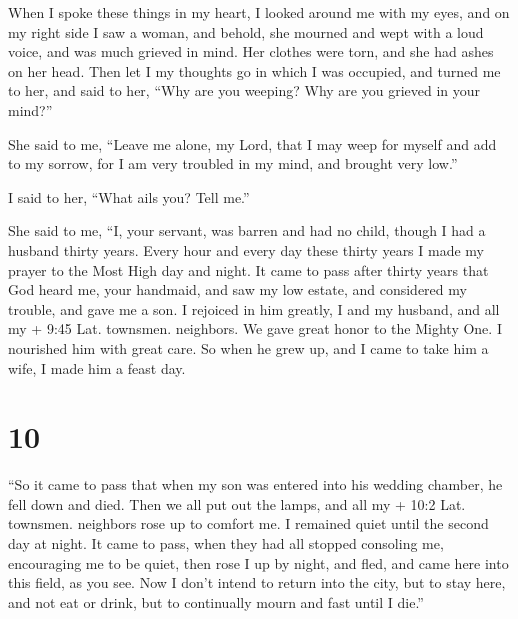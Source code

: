  When I spoke these things in my heart, I looked around me
with my eyes, and on my right side I saw a woman, and behold, she
mourned and wept with a loud voice, and was much grieved in mind. Her
clothes were torn, and she had ashes on her head.  Then let
I my thoughts go in which I was occupied, and turned me to her,
 and said to her, ``Why are you weeping? Why are you
grieved in your mind?''

 She said to me, ``Leave me alone, my Lord, that I may weep
for myself and add to my sorrow, for I am very troubled in my mind, and
brought very low.''

 I said to her, ``What ails you? Tell me.''

 She said to me, ``I, your servant, was barren and had no
child, though I had a husband thirty years.  Every hour and
every day these thirty years I made my prayer to the Most High day and
night.  It came to pass after thirty years that God heard
me, your handmaid, and saw my low estate, and considered my trouble, and
gave me a son. I rejoiced in him greatly, I and my husband, and all my +
9:45 Lat. townsmen. neighbors. We gave great honor to the Mighty One.
 I nourished him with great care.  So when he
grew up, and I came to take him a wife, I made him a feast day.

\hypertarget{section-9}{%
\section{10}\label{section-9}}

 ``So it came to pass that when my son was entered into his
wedding chamber, he fell down and died.  Then we all put out
the lamps, and all my + 10:2 Lat. townsmen. neighbors rose up to comfort
me. I remained quiet until the second day at night.  It came
to pass, when they had all stopped consoling me, encouraging me to be
quiet, then rose I up by night, and fled, and came here into this field,
as you see.  Now I don't intend to return into the city, but
to stay here, and not eat or drink, but to continually mourn and fast
until I die.''

